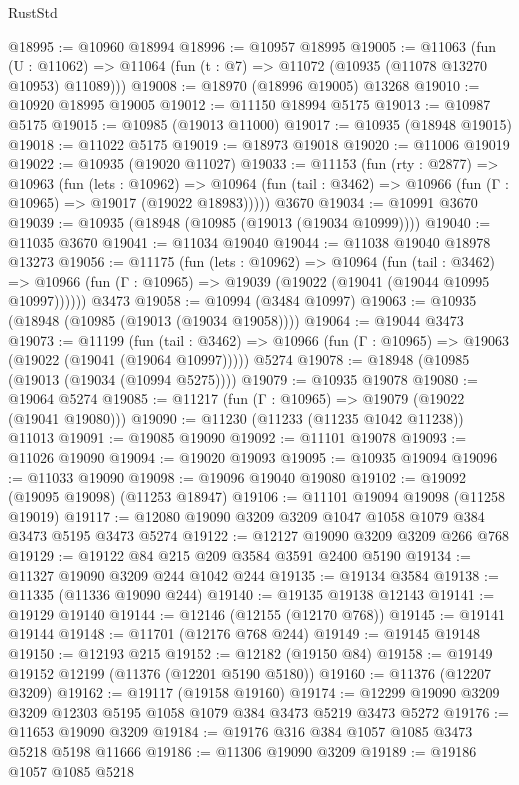 \begin{lexlean}{RustStd}
\begin{coremodule}
{\begin{coremodule}
{{{{{{{{{{{{{{{{{{{{{{{{{{{{{{{{{{{{{{{{{{{{{{{{{{{{{{{{{{{{{{{{{{{{{{{{{{{{{{{{{{{{{@18995 := @10960 @18994
@18996 := @10957 @18995
@19005 := @11063
    (fun (U : @11062) => @11064 (fun (t : @7) => @11072 (@10935 (@11078 @13270 @10953) @11089)))
@19008 := @18970 (@18996 @19005) @13268
@19010 := @10920 @18995 @19005
@19012 := @11150 @18994 @5175
@19013 := @10987 @5175
@19015 := @10985 (@19013 @11000)
@19017 := @10935 (@18948 @19015)
@19018 := @11022 @5175
@19019 := @18973 @19018
@19020 := @11006 @19019
@19022 := @10935 (@19020 @11027)
@19033 := @11153
    (fun (rty : @2877) =>
    @10963
      (fun (lets : @10962) =>
      @10964 (fun (tail : @3462) => @10966 (fun (Γ : @10965) => @19017 (@19022 @18983)))))
    @3670
@19034 := @10991 @3670
@19039 := @10935 (@18948 (@10985 (@19013 (@19034 @10999))))
@19040 := @11035 @3670
@19041 := @11034 @19040
@19044 := @11038 @19040 @18978 @13273
@19056 := @11175
    (fun (lets : @10962) =>
    @10964
      (fun (tail : @3462) =>
      @10966 (fun (Γ : @10965) => @19039 (@19022 (@19041 (@19044 @10995 @10997))))))
    @3473
@19058 := @10994 (@3484 @10997)
@19063 := @10935 (@18948 (@10985 (@19013 (@19034 @19058))))
@19064 := @19044 @3473
@19073 := @11199
    (fun (tail : @3462) => @10966 (fun (Γ : @10965) => @19063 (@19022 (@19041 (@19064 @10997)))))
    @5274
@19078 := @18948 (@10985 (@19013 (@19034 (@10994 @5275))))
@19079 := @10935 @19078
@19080 := @19064 @5274
@19085 := @11217 (fun (Γ : @10965) => @19079 (@19022 (@19041 @19080)))
@19090 := @11230 (@11233 (@11235 @1042 @11238)) @11013
@19091 := @19085 @19090
@19092 := @11101 @19078
@19093 := @11026 @19090
@19094 := @19020 @19093
@19095 := @10935 @19094
@19096 := @11033 @19090
@19098 := @19096 @19040 @19080
@19102 := @19092 (@19095 @19098) (@11253 @18947)
@19106 := @11101 @19094 @19098 (@11258 @19019)
@19117 := @12080 @19090 @3209 @3209 @1047 @1058 @1079 @384 @3473 @5195 @3473 @5274
@19122 := @12127 @19090 @3209 @3209 @266 @768
@19129 := @19122 @84 @215 @209 @3584 @3591 @2400 @5190
@19134 := @11327 @19090 @3209 @244 @1042 @244
@19135 := @19134 @3584
@19138 := @11335 (@11336 @19090 @244)
@19140 := @19135 @19138 @12143
@19141 := @19129 @19140
@19144 := @12146 (@12155 (@12170 @768))
@19145 := @19141 @19144
@19148 := @11701 (@12176 @768 @244)
@19149 := @19145 @19148
@19150 := @12193 @215
@19152 := @12182 (@19150 @84)
@19158 := @19149 @19152 @12199 (@11376 (@12201 @5190 @5180))
@19160 := @11376 (@12207 @3209)
@19162 := @19117 (@19158 @19160)
@19174 := @12299 @19090 @3209 @3209 @12303 @5195 @1058 @1079 @384 @3473 @5219 @3473 @5272
@19176 := @11653 @19090 @3209
@19184 := @19176 @316 @384 @1057 @1085 @3473 @5218 @5198 @11666
@19186 := @11306 @19090 @3209
@19189 := @19186 @1057 @1085 @5218
}}}}}}}}}}}}}}}}}}}}}}}}}}}}}}}}}}}}}}}}}}}}}}}}}}}}}}}}}}}}}}}}}}}}}}}}}}}}}}}}}}}}}
\end{coremodule}}
\end{coremodule}
\end{lexlean}
